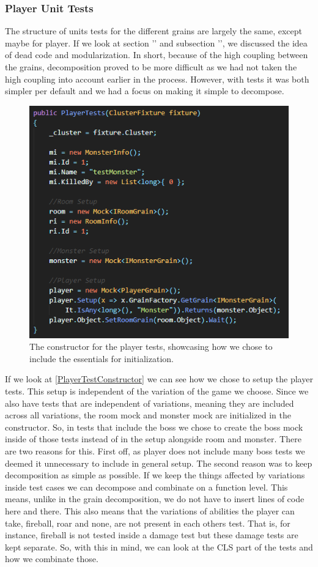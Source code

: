 \subsubsection{Player Unit Tests} \label{playerUnit}
The structure of units tests for the different grains are largely the same, except maybe for player. If we look at section '' and subsection '', we discussed the idea of dead code and modularization. In short, because of the high coupling between the grains, decomposition proved to be more difficult as we had not taken the high coupling into account earlier in the process. However, with tests it was both simpler per default and we had a focus on making it simple to decompose. \\
\begin{figure}[h]
    \centering
    \includegraphics[width=0.7\linewidth]{Materials/TestingDiscussion/PlayerTestConstructor}
    \caption{The constructor for the player tests, showcasing how we chose to include the essentials for initialization.}
    \label{PlayerTestConstructor}
\end{figure}
If we look at \autoref{PlayerTestConstructor} we can see how we chose to setup the player tests. This setup is independent of the variation of the game we choose. Since we also have tests that are independent of variations, meaning they are included across all variations, the room mock and monster mock are initialized in the constructor. So, in tests that include the boss we chose to create the boss mock inside of those tests instead of in the setup alongside room and monster. There are two reasons for this. First off, as player does not include many boss tests we deemed it unnecessary to include in general setup. The second reason was to keep decomposition as simple as possible. If we keep the things affected by variations inside test cases we can decompose and combinate on a function level. This means, unlike in the grain decomposition, we do not have to insert lines of code here and there. This also means that the variations of abilities the player can take, fireball, roar and none, are not present in each others test. That is, for instance, fireball is not tested inside a damage test but these damage tests are kept separate. So, with this in mind, we can look at the CLS part of the tests and how we combinate those. \\
